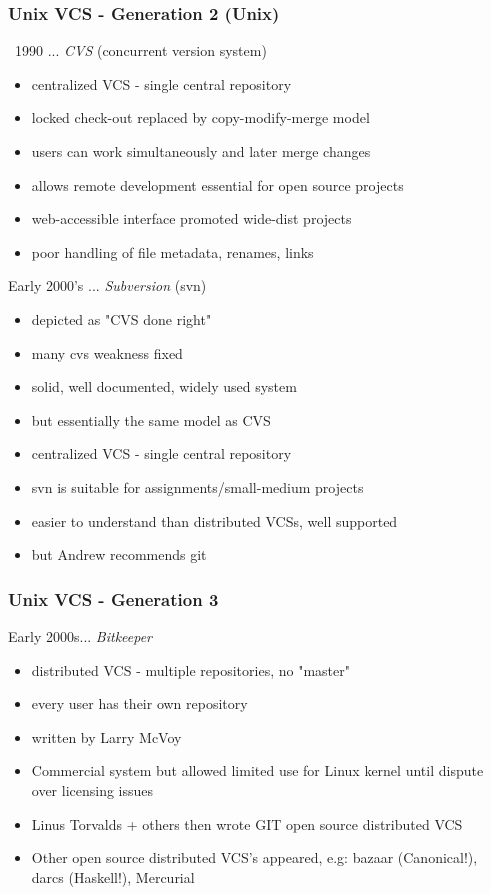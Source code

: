 \begin{frame}
\frametitle{Unix VCS - Generation 2 (Unix)}
~1990 ... {\em{CVS}} (concurrent version system)
\begin{itemize}
\item  centralized VCS - single central repository
\item  locked check-out replaced by copy-modify-merge model
\item  users can work simultaneously and later merge changes
\item  allows remote development essential for open source projects
\item  web-accessible interface promoted wide-dist projects
\item  poor handling of file metadata, renames, links 
\end{itemize}

Early 2000's ... {\em{Subversion}} (svn)
\begin{itemize}
\item  depicted as "CVS done right"
\item  many cvs weakness fixed 
\item  solid, well documented, widely used system
\item  but essentially the same model as CVS
\item  centralized VCS - single central repository
\item  svn is suitable for  assignments/small-medium projects
\item  easier to understand than distributed VCSs, well supported
\item  but Andrew recommends git
\end{itemize}
\end{frame}

\begin{frame}
\frametitle{Unix VCS - Generation 3}
Early 2000s... {\em{Bitkeeper}} 
\begin{itemize}
\item  distributed VCS - multiple repositories, no "master"
\item  every user has their own repository
\item  written by Larry McVoy
\item  Commercial system but allowed limited use for Linux kernel until dispute over  licensing issues
\item  Linus Torvalds + others  then wrote GIT open source distributed VCS
\item  Other open source distributed VCS's appeared, e.g: bazaar {\small (Canonical!)}, darcs {\small (Haskell!)}, Mercurial
\end{itemize}
\end{frame}

